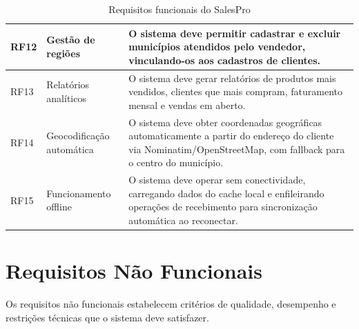 \documentclass[
	12pt,				%
	oneside,			%
	a4paper,			%
	english,			%
	brazil				%
	]{abntex2}
\begin{document}
\begin{table}[htb]
\begin{tabular}{|p{1.5cm}|p{3.5cm}|p{7.5cm}|}
  \hline
  RF12 & Gestão de regiões & O sistema deve permitir cadastrar e excluir municípios atendidos pelo vendedor, vinculando-os aos cadastros de clientes. \\
  \hline
  RF13 & Relatórios analíticos & O sistema deve gerar relatórios de produtos mais vendidos, clientes que mais compram, faturamento mensal e vendas em aberto. \\
  \hline
  RF14 & Geocodificação automática & O sistema deve obter coordenadas geográficas automaticamente a partir do endereço do cliente via Nominatim/OpenStreetMap, com fallback para o centro do município. \\
  \hline
  RF15 & Funcionamento offline & O sistema deve operar sem conectividade, carregando dados do cache local e enfileirando operações de recebimento para sincronização automática ao reconectar. \\
  \hline
\end{tabular}
\caption{Requisitos funcionais do SalesPro}
\label{tab:rf}
\end{table}

\section{Requisitos Não Funcionais}

Os requisitos não funcionais estabelecem critérios de qualidade, desempenho e restrições técnicas que o sistema deve satisfazer.
\end{document}
